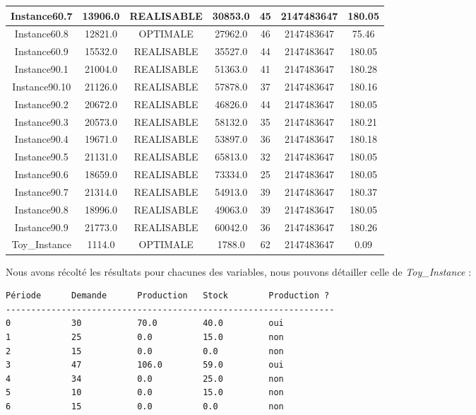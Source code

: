 \documentclass[10pt]{article}
\begin{document}
\begin{table}[h]
{\begin{tabular}{|c|c|c|c|c|c|c|}
\hline
Instance60.7 & 13906.0 & REALISABLE & 30853.0 & 45 & 2147483647 & 180.05 \\
\hline
Instance60.8 & 12821.0 & OPTIMALE & 27962.0 & 46 & 2147483647 & 75.46 \\
\hline
Instance60.9 & 15532.0 & REALISABLE & 35527.0 & 44 & 2147483647 & 180.05 \\
\hline
Instance90.1 & 21004.0 & REALISABLE & 51363.0 & 41 & 2147483647 & 180.28 \\
\hline
Instance90.10 & 21126.0 & REALISABLE & 57878.0 & 37 & 2147483647 & 180.16 \\
\hline
Instance90.2 & 20672.0 & REALISABLE & 46826.0 & 44 & 2147483647 & 180.05 \\
\hline
Instance90.3 & 20573.0 & REALISABLE & 58132.0 & 35 & 2147483647 & 180.21 \\
\hline
Instance90.4 & 19671.0 & REALISABLE & 53897.0 & 36 & 2147483647 & 180.18 \\
\hline
Instance90.5 & 21131.0 & REALISABLE & 65813.0 & 32 & 2147483647 & 180.05 \\
\hline
Instance90.6 & 18659.0 & REALISABLE & 73334.0 & 25 & 2147483647 & 180.05 \\
\hline
Instance90.7 & 21314.0 & REALISABLE & 54913.0 & 39 & 2147483647 & 180.37 \\
\hline
Instance90.8 & 18996.0 & REALISABLE & 49063.0 & 39 & 2147483647 & 180.05 \\
\hline
Instance90.9 & 21773.0 & REALISABLE & 60042.0 & 36 & 2147483647 & 180.26 \\
\hline
Toy\_Instance & 1114.0 & OPTIMALE & 1788.0 & 62 & 2147483647 & 0.09 \\
\hline
\end{tabular}%
  }
  
\end{table}

Nous avons récolté les résultats pour chacunes des variables, nous pouvons détailler celle de \textit{Toy\_Instance} :

\begin{verbatim}
Période      Demande      Production   Stock        Production ?
-----------------------------------------------------------------
0            30           70.0         40.0         oui
1            25           0.0          15.0         non
2            15           0.0          0.0          non
3            47           106.0        59.0         oui
4            34           0.0          25.0         non
5            10           0.0          15.0         non
6            15           0.0          0.0          non
\end{verbatim}
\end{document}
